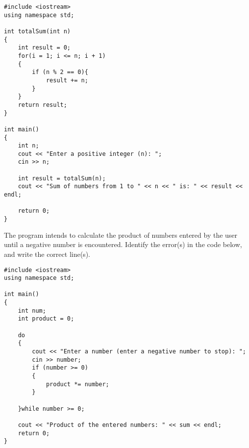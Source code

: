 \begin{verbatim}
#include <iostream>
using namespace std;

int totalSum(int n)
{
    int result = 0;
    for(i = 1; i <= n; i + 1)
    {
        if (n % 2 == 0){
            result += n;
        }
    }
    return result;
}

int main() 
{
    int n;
    cout << "Enter a positive integer (n): ";
    cin >> n;

    int result = totalSum(n);
    cout << "Sum of numbers from 1 to " << n << " is: " << result << endl;

    return 0;
}
\end{verbatim}

\begin{multipart}
The program intends to calculate the product of numbers entered by the user until a negative number is encountered. Identify the error(s) in the code below, and write the correct line(s).
\end{multipart}

\begin{verbatim}
#include <iostream>
using namespace std;

int main() 
{
    int num;
    int product = 0;

    do 
    {
        cout << "Enter a number (enter a negative number to stop): ";
        cin >> number;
        if (number >= 0) 
        {
            product *= number;
        }

    }while number >= 0;

    cout << "Product of the entered numbers: " << sum << endl;
    return 0;
}
\end{verbatim}

\newpage 

